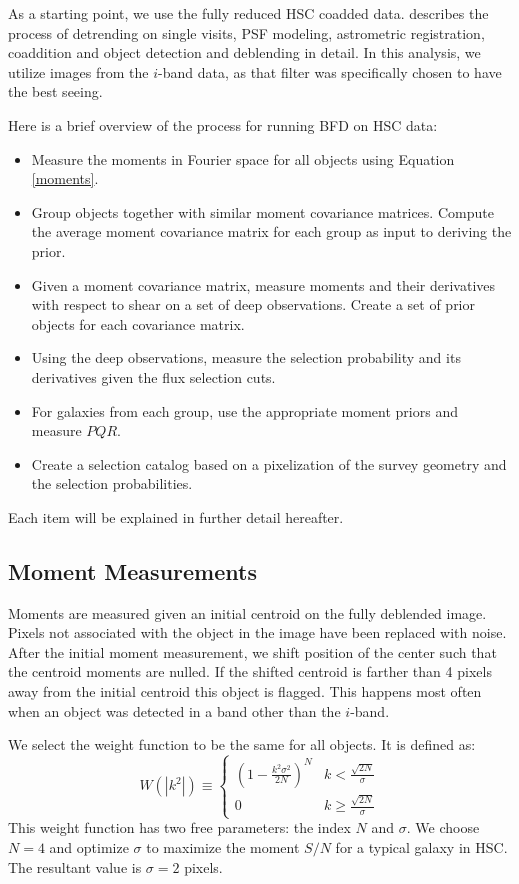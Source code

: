 \documentclass[useAMS,usenatbib]{mnras}
\begin{document}
As a starting point, we use the fully reduced HSC coadded data. \citep{CatalogPaper:inprep} describes the process of detrending on single visits, PSF modeling, astrometric registration, coaddition and object detection and deblending in detail.  In this analysis, we utilize images from the $i$-band data, as that filter was specifically chosen to have the best seeing.  

Here is a brief overview of the process for running BFD on HSC data:
\begin{itemize}
\item Measure the moments in Fourier space for all objects using Equation \ref{moments}.  
\item Group objects together with similar moment covariance matrices.  Compute the average moment covariance matrix for each group as input to deriving the prior.
\item Given a moment covariance matrix, measure moments and their derivatives with respect to shear on a set of deep observations.  Create a set of prior objects for each covariance matrix. 
\item Using the deep observations, measure the selection probability and its derivatives given the flux selection cuts.
\item For galaxies from each group, use the appropriate moment priors and measure $PQR$.
\item Create a selection catalog based on a pixelization of the survey geometry and the selection probabilities.
\end{itemize}
Each item will be explained in further detail hereafter. 

\subsection{Moment Measurements}
Moments are measured given an initial centroid on the fully deblended image.  Pixels not associated with the object in the image have been replaced with noise.  After the initial moment measurement, we shift position of the center such that the centroid moments are nulled.  If the shifted centroid is farther than 4 pixels away from the initial centroid this object is flagged.  This happens most often when an object was detected in a band other than the $i$-band.

We select the weight function to be the same for all objects.  It is defined as:
\begin{equation}
\label{ksigma}
W\left(|k^2|\right)  \equiv \left\{ 
\begin{array}{cc}
\left( 1 - \frac{k^2\sigma^2}{2N}\right)^N & k <\frac{\sqrt{2N}}{\sigma} \\
0                                          & k \ge \frac{\sqrt{2N}}{\sigma} 
\end{array}
\right.
\end{equation}
This weight function has two free parameters: the index $N$ and $\sigma$.  We choose $N=4$ and optimize $\sigma$ to maximize the moment $S/N$ for a typical galaxy in HSC.  The resultant value is $\sigma=2$ pixels.
\end{document}
